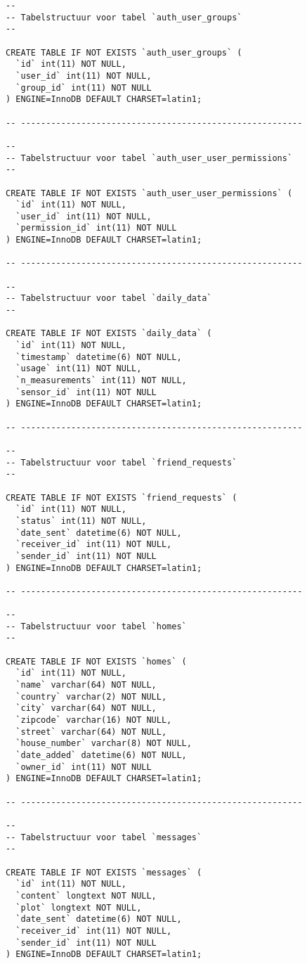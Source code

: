 \documentclass[11pt]{article}
\begin{document}
\begin{lstlisting}[style=SQL]
--
-- Tabelstructuur voor tabel `auth_user_groups`
--

CREATE TABLE IF NOT EXISTS `auth_user_groups` (
  `id` int(11) NOT NULL,
  `user_id` int(11) NOT NULL,
  `group_id` int(11) NOT NULL
) ENGINE=InnoDB DEFAULT CHARSET=latin1;

-- --------------------------------------------------------

--
-- Tabelstructuur voor tabel `auth_user_user_permissions`
--

CREATE TABLE IF NOT EXISTS `auth_user_user_permissions` (
  `id` int(11) NOT NULL,
  `user_id` int(11) NOT NULL,
  `permission_id` int(11) NOT NULL
) ENGINE=InnoDB DEFAULT CHARSET=latin1;

-- --------------------------------------------------------

--
-- Tabelstructuur voor tabel `daily_data`
--

CREATE TABLE IF NOT EXISTS `daily_data` (
  `id` int(11) NOT NULL,
  `timestamp` datetime(6) NOT NULL,
  `usage` int(11) NOT NULL,
  `n_measurements` int(11) NOT NULL,
  `sensor_id` int(11) NOT NULL
) ENGINE=InnoDB DEFAULT CHARSET=latin1;

-- --------------------------------------------------------

--
-- Tabelstructuur voor tabel `friend_requests`
--

CREATE TABLE IF NOT EXISTS `friend_requests` (
  `id` int(11) NOT NULL,
  `status` int(11) NOT NULL,
  `date_sent` datetime(6) NOT NULL,
  `receiver_id` int(11) NOT NULL,
  `sender_id` int(11) NOT NULL
) ENGINE=InnoDB DEFAULT CHARSET=latin1;

-- --------------------------------------------------------

--
-- Tabelstructuur voor tabel `homes`
--

CREATE TABLE IF NOT EXISTS `homes` (
  `id` int(11) NOT NULL,
  `name` varchar(64) NOT NULL,
  `country` varchar(2) NOT NULL,
  `city` varchar(64) NOT NULL,
  `zipcode` varchar(16) NOT NULL,
  `street` varchar(64) NOT NULL,
  `house_number` varchar(8) NOT NULL,
  `date_added` datetime(6) NOT NULL,
  `owner_id` int(11) NOT NULL
) ENGINE=InnoDB DEFAULT CHARSET=latin1;

-- --------------------------------------------------------

--
-- Tabelstructuur voor tabel `messages`
--

CREATE TABLE IF NOT EXISTS `messages` (
  `id` int(11) NOT NULL,
  `content` longtext NOT NULL,
  `plot` longtext NOT NULL,
  `date_sent` datetime(6) NOT NULL,
  `receiver_id` int(11) NOT NULL,
  `sender_id` int(11) NOT NULL
) ENGINE=InnoDB DEFAULT CHARSET=latin1;


\end{lstlisting}
\end{document}
